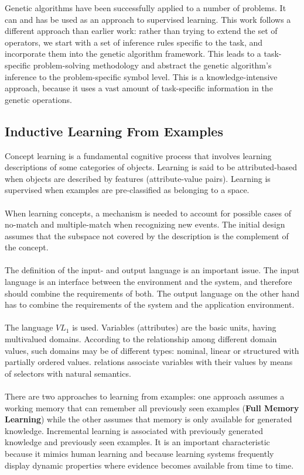 \documentclass[../main.tex]{subfiles}
\begin{document}
Genetic algorithms have been successfully applied to a number of problems. It can and has be used as an approach to
supervised learning. This work follows a different approach than earlier work: rather than trying to extend the set of
operators, we start with a set of inference rules specific to the task, and incorporate them into the genetic algorithm
framework. This leads to a  task-specific problem-solving methodology and abstract the genetic algorithm's inference to
the problem-specific symbol level. This is a knowledge-intensive approach, because it uses a vast amount of task-specific information in the genetic operations.

\subsection{Inductive Learning From Examples}
Concept learning is a fundamental cognitive process that involves learning descriptions
of some categories of objects.  Learning is said to be attributed-based when objects are described by features (attribute-value pairs). Learning is supervised when examples are pre-classified as belonging to a space.
\\\\
When learning concepts, a mechanism is needed to account for possible cases of no-match and multiple-match when
recognizing new events. The initial design assumes that the subspace not covered by the description is the complement
of the concept.
\\\\
The definition of the input- and output language is an important issue. The input language is an interface between the environment and the system, and therefore should combine the requirements of both. The output language on the other hand has to combine the requirements of the system and the application environment.
\\\\
The language $VL_1$ is used. Variables (attributes) are the basic units, having multivalued domains. According to the relationship among different domain values, such domains may be of different types: nominal, linear or structured with partially ordered values. relations associate variables with their values by means of selectors with natural semantics.
\\\\
There are two approaches to learning from examples: one approach assumes a working memory that can remember all previously seen examples (\textbf{Full Memory Learning}) while the other assumes that memory is only available for generated knowledge. Incremental learning is associated with previously generated knowledge and previously seen examples. It is an important characteristic because it mimics human learning and because learning systems frequently display dynamic properties where evidence becomes available from time to time.
\end{document}
